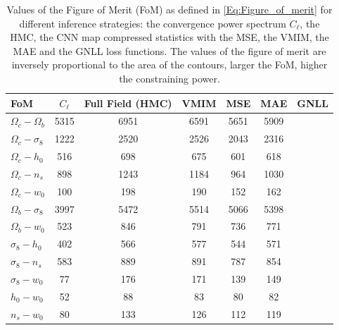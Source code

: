 \documentclass{aa}
\begin{document}
\begin{center}
\begin{table}
\caption{ Values of the Figure of Merit (FoM) as defined in \autoref{Eq:Figure_of_merit} for different inference strategies: the convergence power spectrum $C_{\ell}$, the HMC, the CNN map compressed statistics with the MSE, the VMIM, the MAE and the GNLL loss functions. The values of the figure of merit are inversely proportional to the area of the contours, larger the FoM, higher the constraining power.}
\begin{tabular}{lcccccc} 
 \hline
    FoM & $C_{\ell}$ & Full Field (HMC)&  VMIM & MSE & MAE & GNLL   \\
  \hline\hline
 $\Omega_c-  \Omega_b$ & 5315 & 6951 & 6591 & 5651 & 5909\\
 $\Omega_c-  \sigma_8$ & 1222 & 2520 & 2526 & 2043 & 2316\\
 $\Omega_c-  h_0$      & 516  & 698  & 675  & 601  & 618\\
 $\Omega_c-  n_s$      & 898  & 1243 & 1184 & 964  & 1030\\
 $\Omega_c-  w_0$      & 100  & 198  & 190  & 152  & 162\\
 $\Omega_b-  \sigma_8$ & 3997 & 5472 & 5514 & 5066 & 5398\\
 $\Omega_b-  w_0$      & 523  & 846  & 791  & 736  & 771\\
 $\sigma_8-  h_0$      & 402  & 566  & 577  & 544  & 571\\
 $\sigma_8-  n_s$      & 583  & 889  & 891  & 787  & 854\\ 
 $\sigma_8-  w_0$      & 77   & 176  & 171  & 139  & 149\\
 $h_0-       w_0$      & 52   & 88   & 83   & 80   & 82\\
 $n_s-       w_0$      & 80   & 133  & 126  & 112  & 119 \\
     \hline
\end{tabular}
\label{tab:f_o_m}
\end{table}
\end{center}
\end{document}
